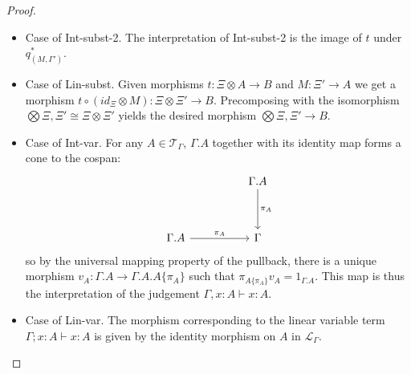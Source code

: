 \begin{thm}
\begin{proof}
\begin{itemize}
\item Case of Int-subst-2. The interpretation of Int-subst-2 is the image of $t$ under $q_{(M, \Gamma')}^*$.
\item Case of Lin-subst. Given morphisms $t : \Xi \otimes A \to B$ and $M : \Xi' \to A$ we get a morphism $t \circ (id_\Xi \otimes M) : \Xi \otimes \Xi' \to B$. Precomposing with the isomorphism $\bigotimes \Xi, \Xi' \cong \Xi \otimes \Xi'$ yields the desired morphism $\bigotimes \Xi, \Xi' \to B$.
\item Case of Int-var. For any $A \in \mathcal{T}_\Gamma$, $\Gamma.A$ together with its identity map forms a cone to the cospan:
  \[
    \ti
& \Gamma.A \ar[d, "\pi_A"]\\
    \Gamma.A \ar[r, "\pi_A"] & \Gamma
    \kz
  \]
  so by the universal mapping property of the pullback, there is a unique morphism $v_A : \Gamma.A \to \Gamma.A.A\{\pi_A\}$ such that $\pi_{A\{\pi_A\}}v_A = 1_{\Gamma.A}$.
  This map is thus the interpretation of the judgement $\Gamma, x : A \vdash x : A$.
\item Case of Lin-var. The morphism corresponding to the linear variable term $\Gamma; x : A \vdash x : A$ is given by the identity morphism on $A$ in $\mathcal{L}_{\Gamma}$.
\end{itemize}
\end{proof}
\end{thm}
